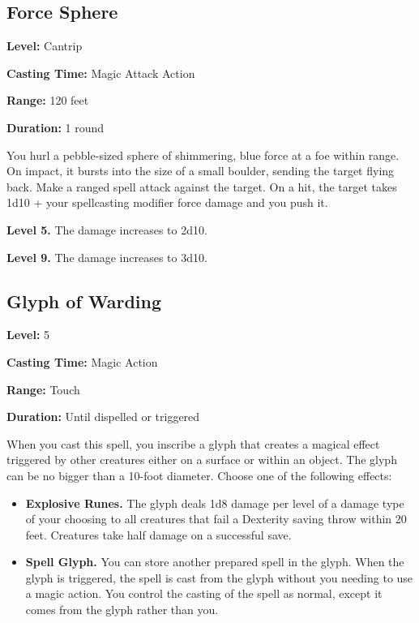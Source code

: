 \documentclass[12pt,letterpaper,twocolumn,openany,nodeprecatedcode,bg=none]{dndbook}
\providecommand{\tightlist}{%
  \setlength{\itemsep}{0pt}\setlength{\parskip}{0pt}}
\begin{document}
\subsection{Force Sphere}\label{force-sphere}

\textbf{Level:} Cantrip

\textbf{Casting Time:} Magic Attack Action

\textbf{Range:} 120 feet

\textbf{Duration:} 1 round

You hurl a pebble-sized sphere of shimmering, blue force at a foe within
range. On impact, it bursts into the size of a small boulder, sending
the target flying back. Make a ranged spell attack against the target.
On a hit, the target takes 1d10 + your spellcasting modifier force
damage and you push it.

\textbf{Level 5.} The damage increases to 2d10.

\textbf{Level 9.} The damage increases to 3d10.

\subsection{Glyph of Warding}\label{glyph-of-warding}

\textbf{Level:} 5

\textbf{Casting Time:} Magic Action

\textbf{Range:} Touch

\textbf{Duration:} Until dispelled or triggered

When you cast this spell, you inscribe a glyph that creates a magical
effect triggered by other creatures either on a surface or within an
object. The glyph can be no bigger than a 10-foot diameter. Choose one
of the following effects:

\begin{itemize}
\tightlist
\item
  \textbf{Explosive Runes.} The glyph deals 1d8 damage per level of a
  damage type of your choosing to all creatures that fail a Dexterity
  saving throw within 20 feet. Creatures take half damage on a
  successful save.
\item
  \textbf{Spell Glyph.} You can store another prepared spell in the
  glyph. When the glyph is triggered, the spell is cast from the glyph
  without you needing to use a magic action. You control the casting of
  the spell as normal, except it comes from the glyph rather than you.
\end{itemize}
\end{document}
